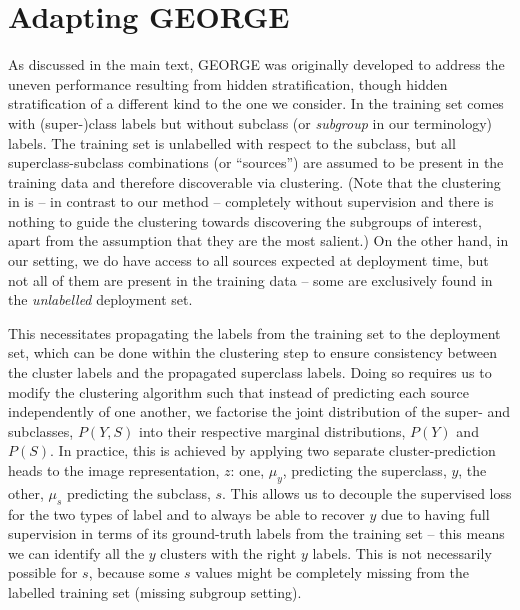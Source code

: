 \section{Adapting GEORGE}\label{adapting_g}
%
As discussed in the main text, GEORGE \cite{SohDunAngGuetal20} was originally developed to address
the uneven performance resulting from hidden stratification, though hidden stratification of a
different kind to the one we consider. 
%
In \cite{SohDunAngGuetal20} the training set comes with (super-)class labels but without subclass
(or \emph{subgroup} in our terminology) labels. 
%
The training set is unlabelled with respect to the subclass, but all superclass-subclass
combinations (or ``sources'') are assumed to be present in the training data and therefore
discoverable via clustering. 
%
(Note that the clustering in \cite{SohDunAngGuetal20} is -- in contrast to our method -- completely
without supervision and there is nothing to guide the clustering towards discovering the subgroups
of interest, apart from the assumption that they are the most salient.) 
%
On the other hand, in our setting, we do have access to all sources expected at deployment time,
but not all of them are present in the training data -- some are exclusively found in the
\emph{unlabelled} deployment set.
%

This necessitates propagating the labels from the training set to the deployment set, which can be
done within the clustering step to ensure consistency between the cluster labels and the propagated
superclass labels. 
%
Doing so requires us to modify the clustering algorithm such that instead of predicting each source
independently of one another, we factorise the joint distribution of the super- and subclasses,
$P(Y, S)$ into their respective marginal distributions, $P(Y)$ and $P(S)$.
%
In practice, this is achieved by applying two separate cluster-prediction heads to the image
representation, $z$: one, $\mu_y$, predicting the superclass, $y$, the other, $\mu_s$ predicting
the subclass, $s$. 
%
This allows us to decouple the supervised loss for the two types of label and to always be able to
recover $y$ due to having full supervision in terms of its ground-truth labels from the training
set -- this means we can identify all the $y$ clusters with the right $y$ labels.
%
This is not necessarily possible for $s$, because some $s$ values might be completely missing from
the labelled training set (missing subgroup setting).

